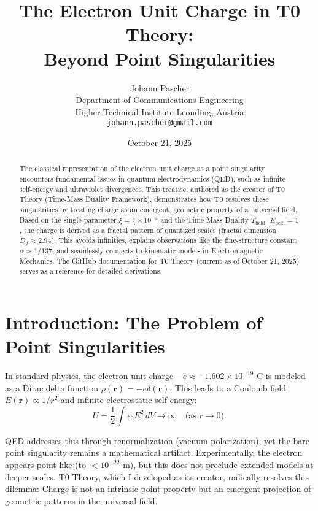 \documentclass[12pt,a4paper]{article}
\title{The Electron Unit Charge in T0 Theory:\\Beyond Point Singularities}
\author{Johann Pascher\\
	Department of Communications Engineering\\
	Higher Technical Institute Leonding, Austria\\
	\texttt{johann.pascher@gmail.com}}
\date{October 21, 2025}
\begin{document}
	
	\maketitle
	
	\begin{abstract}
		The classical representation of the electron unit charge as a point singularity encounters fundamental issues in quantum electrodynamics (QED), such as infinite self-energy and ultraviolet divergences. This treatise, authored as the creator of T0 Theory (Time-Mass Duality Framework), demonstrates how T0 resolves these singularities by treating charge as an emergent, geometric property of a universal field. Based on the single parameter $\xi = \frac{4}{3} \times 10^{-4}$ and the Time-Mass Duality $T_{\text{field}} \cdot E_{\text{field}} = 1$, the charge is derived as a fractal pattern of quantized scales (fractal dimension $D_f \approx 2.94$). This avoids infinities, explains observations like the fine-structure constant $\alpha \approx 1/137$, and seamlessly connects to kinematic models in Electromagnetic Mechanics. The GitHub documentation for T0 Theory (current as of October 21, 2025) serves as a reference for detailed derivations.
	\end{abstract}
	
	\tableofcontents
	
	\section{Introduction: The Problem of Point Singularities}
	\label{sec:intro}
	
	In standard physics, the electron unit charge $-e \approx -1.602 \times 10^{-19}$ C is modeled as a Dirac delta function $\rho(\mathbf{r}) = -e \delta(\mathbf{r})$. This leads to a Coulomb field $E(\mathbf{r}) \propto 1/r^2$ and infinite electrostatic self-energy:
	\begin{equation}
		U = \frac{1}{2} \int \epsilon_0 E^2 \, dV \to \infty \quad \text{(as $r \to 0$)}.
	\end{equation}
	
	QED addresses this through renormalization (vacuum polarization), yet the bare point singularity remains a mathematical artifact. Experimentally, the electron appears point-like (to $< 10^{-22}$ m), but this does not preclude extended models at deeper scales. T0 Theory, which I developed as its creator, radically resolves this dilemma: Charge is not an intrinsic point property but an emergent projection of geometric patterns in the universal field.
	
\end{document}
